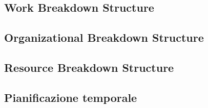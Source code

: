 \subsection{Work Breakdown Structure}

\newpage

\subsection{Organizational Breakdown Structure}

\newpage

\subsection{Resource Breakdown Structure}

\newpage

\subsection{Pianificazione temporale}

\newpage